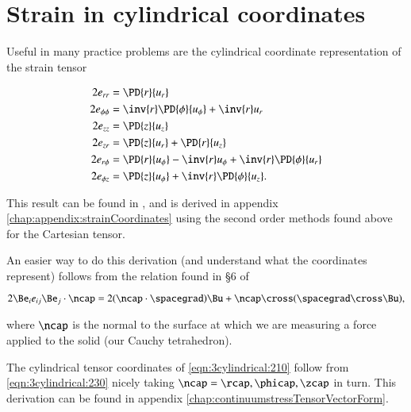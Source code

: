 % 
% 
% 
% 
% 
% 
% 
% 
% 
% 
% 
% 

\section{Strain in cylindrical coordinates}

Useful in many practice problems are the cylindrical coordinate representation of the strain tensor 

\begin{align}\label{eqn:3cylindrical:210}
2 e_{rr} &= \PD{r}{u_r}  \\
2 e_{\phi\phi} &= \inv{r} \PD{\phi}{u_\phi} +\inv{r} u_r  \\
2 e_{zz} &= \PD{z}{u_z}  \\
2 e_{zr} &= \PD{z}{u_r} + \PD{r}{u_z} \\
2 e_{r\phi} &= \PD{r}{u_\phi} - \inv{r} u_\phi + \inv{r} \PD{\phi}{u_r} \\
2 e_{\phi z} &= \PD{z}{u_\phi} +\inv{r} \PD{\phi}{u_z}.
\end{align}

This result can be found in \citep{landau1960theory}, and is derived in appendix \ref{chap:appendix:strainCoordinates} using the second order methods found above for the Cartesian tensor.

An easier way to do this derivation (and understand what the coordinates represent) follows from the relation found in \S 6 of \citep{acheson1990elementary}

\begin{equation}\label{eqn:3cylindrical:230}
2 \Be_i e_{ij} \Be_j \cdot \ncap = 2 (\ncap \cdot \spacegrad) \Bu + \ncap \cross (\spacegrad \cross \Bu),
\end{equation}

where $\ncap$ is the normal to the surface at which we are measuring a force applied to the solid (our Cauchy tetrahedron).

The cylindrical tensor coordinates of \ref{eqn:3cylindrical:210} follow from 
\ref{eqn:3cylindrical:230} nicely taking $\ncap = \rcap, \phicap, \zcap$ in turn.  This derivation can be found in appendix \ref{chap:continuumstressTensorVectorForm}.
